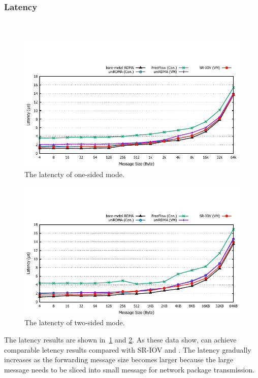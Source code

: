 \subsubsection{\textbf{Latency}}
\
\noindent

\begin{figure}[!ht]
	\centering
	\includegraphics[width=1.0\linewidth]{images/write-lat.pdf}
	\caption{The latencty of one-sided mode.}
	\label{fig:write-lat}
\end{figure}


\begin{figure}[!ht]
	\centering
	\includegraphics[width=1.0\linewidth]{images/send-lat.pdf}
	\caption{The latencty of two-sided mode.}
	\label{fig:send-lat}
\end{figure}

The latency results are shown in~\ref{fig:write-lat} and \ref{fig:send-lat}. As these data show, \sys can achieve comparable letency results compared with SR-IOV and \native. The latency gradually increases as the forwarding message size becomes larger because the large message needs to be sliced into small message for network package transmission.

